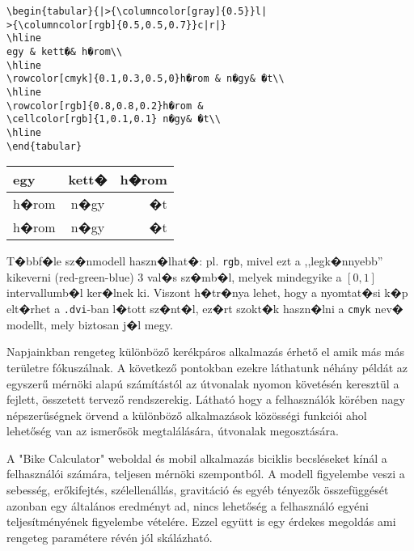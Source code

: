 \begin{verbatim}
\begin{tabular}{|>{\columncolor[gray]{0.5}}l|
>{\columncolor[rgb]{0.5,0.5,0.7}}c|r|}
\hline
egy & kett�& h�rom\\
\hline
\rowcolor[cmyk]{0.1,0.3,0.5,0}h�rom & n�gy& �t\\
\hline
\rowcolor[rgb]{0.8,0.8,0.2}h�rom &
\cellcolor[rgb]{1,0.1,0.1} n�gy& �t\\
\hline
\end{tabular}
\end{verbatim}

\begin{center}
\begin{tabular}{|>{\columncolor[gray]{0.5}}l|>{\columncolor[rgb]{0.5,0.5,0.7}}c|r|}
\hline
egy & kett�& h�rom\\
\hline
\rowcolor[cmyk]{0.1,0.3,0.5,0}h�rom & n�gy& �t\\
\hline
\rowcolor[rgb]{0.8,0.8,0.2}h�rom & \cellcolor[rgb]{1,0.1,0.1} n�gy& �t\\
\hline
\end{tabular}
\end{center}

T�bbf�le sz�nmodell haszn�lhat�: pl. \verb|rgb|, mivel ezt a
,,legk�nnyebb'' kikeverni (red-green-blue) 3 val�s sz�mb�l,
melyek mindegyike a $[0,1]$ intervallumb�l ker�lnek ki. Viszont
h�tr�nya lehet, hogy a nyomtat�si k�p elt�rhet a
\verb|.dvi|-ban l�tott sz�nt�l, ez�rt szokt�k haszn�lni a
\verb|cmyk| nev� modellt, mely biztosan j�l megy.
\fi 

Napjainkban rengeteg különböző kerékpáros alkalmazás érhető el amik más más területre fókuszálnak. A következő pontokban ezekre láthatunk néhány példát az egyszerű mérnöki alapú számítástól az útvonalak nyomon követésén keresztül a fejlett, összetett tervező rendszerekig. Látható hogy a felhasználók körében nagy népszerűségnek örvend a különböző alkalmazások közösségi funkciói ahol lehetőség van az ismerősök megtalálására, útvonalak megosztására.  

A "Bike Calculator" \cite{bikecalculator} weboldal és mobil alkalmazás biciklis becsléseket kínál a felhasználói számára, teljesen mérnöki szempontból. A modell figyelembe veszi a sebesség, erőkifejtés, szélellenállás, gravitáció és egyéb tényezők összefüggését azonban egy általános eredményt ad, nincs lehetőség a felhasználó egyéni teljesítményének figyelembe vételére. Ezzel együtt is egy érdekes megoldás ami rengeteg paramétere révén jól skálázható.

